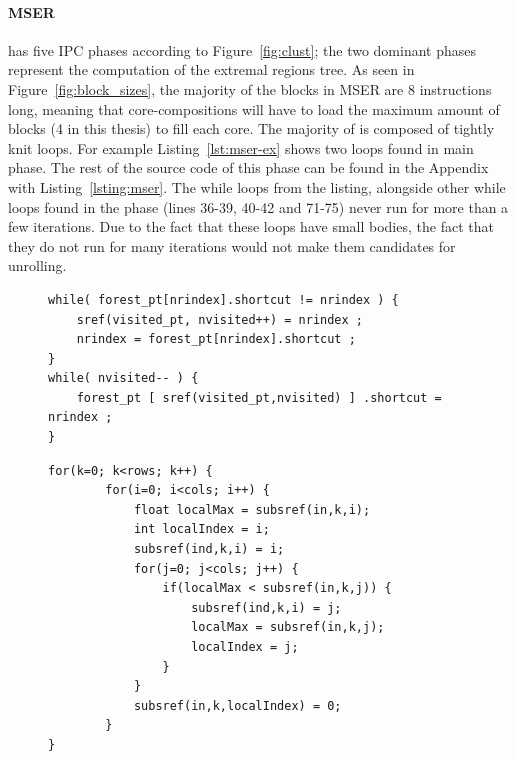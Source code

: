 \paragraph*{MSER}
 has five IPC phases according to Figure~\ref{fig:clust}; the two dominant phases represent the computation of the extremal regions tree.
As seen in Figure~\ref{fig:block_sizes}, the majority of the blocks in MSER are 8 instructions long, meaning that core-compositions will have to load the maximum amount of blocks (4 in this thesis) to fill each core.
The majority of  is composed of tightly knit loops.
For example Listing~\ref{lst:mser-ex} shows two loops found in  main phase.
The rest of the source code of this phase can be found in the Appendix with Listing~\ref{lsting:mser}.
The while loops from the listing, alongside other while loops found in the phase (lines 36-39, 40-42 and 71-75) never run for more than a few iterations.
Due to the fact that these loops have small bodies, the fact that they do not run for many iterations would not make them candidates for unrolling.

\begin{figure}[t]
\lstset{language=C,numbersep=4pt}
\begin{center}
\begin{lstlisting}[firstnumber=27]
while( forest_pt[nrindex].shortcut != nrindex ) {          
	sref(visited_pt, nvisited++) = nrindex ;
	nrindex = forest_pt[nrindex].shortcut ;
}      
while( nvisited-- ) {
	forest_pt [ sref(visited_pt,nvisited) ] .shortcut = nrindex ;
}
\end{lstlisting}
\end{center}
\vspace{-1em}
\label{lst:mser-ex}\vspace{1em}
\vspace{-3em}
\lstset{language=C,numbersep=4pt}
\begin{center}
\begin{lstlisting}[firstnumber=17]
for(k=0; k<rows; k++) {
        for(i=0; i<cols; i++) {
            float localMax = subsref(in,k,i);
            int localIndex = i;
            subsref(ind,k,i) = i;
            for(j=0; j<cols; j++) {
                if(localMax < subsref(in,k,j)) {
                    subsref(ind,k,i) = j;
                    localMax = subsref(in,k,j);
                    localIndex = j;
                }
            }
            subsref(in,k,localIndex) = 0;
        }
}
\end{lstlisting}
\end{center}
\vspace{-1em}
\label{lst:multi_loop}
\vspace{1em}
\end{figure}

